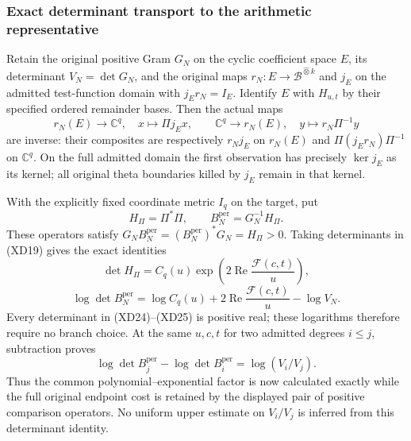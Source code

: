 \subsubsection{Exact determinant transport to the arithmetic representative}

Retain the original positive Gram $G_N$ on the cyclic coefficient
space $E$, its determinant $V_N=\det G_N$, and the original maps
$r_N:E\longrightarrow\mathscr B^{\widehat\otimes k}$ and
$j_E$ on the admitted test-function domain with $j_Er_N=I_E$.
Identify $E$ with $H_{u,t}$ by their specified ordered remainder
bases. Then the actual maps
\[
 r_N(E)\longrightarrow\mathbb C^q,\quad x\longmapsto\Pi j_Ex,
 \qquad
 \mathbb C^q\longrightarrow r_N(E),\quad y\longmapsto r_N\Pi^{-1}y
 \tag{XD22}
\]
are inverse: their composites are respectively $r_Nj_E$ on
$r_N(E)$ and $\Pi(j_Er_N)\Pi^{-1}$ on $\mathbb C^q$.
On the full admitted domain the first observation has precisely
$\ker j_E$ as its kernel; all original theta boundaries killed by
$j_E$ remain in that kernel.

With the explicitly fixed coordinate metric $I_q$ on the target,
put
\[
 H_\Pi=\Pi^*\Pi,\qquad B_N^{\mathrm{per}}=G_N^{-1}H_\Pi.
 \tag{XD23}
\]
These operators satisfy
$G_NB_N^{\mathrm{per}}=(B_N^{\mathrm{per}})^*G_N=H_\Pi>0$.
Taking determinants in (XD19) gives the exact identities
\[
 \det H_\Pi=C_q(u)
       \exp\!\left(2\operatorname{Re}\frac{\mathcal F(c,t)}u\right),
 \tag{XD24}
\]
\[
 \boxed{\log\det B_N^{\mathrm{per}}
 =\log C_q(u)+2\operatorname{Re}\frac{\mathcal F(c,t)}u-\log V_N.}
 \tag{XD25}
\]
Every determinant in (XD24)--(XD25) is positive real; these
logarithms therefore require no branch choice. At the same $u,c,t$
for two admitted degrees $i\leq j$, subtraction proves
\[
 \boxed{\log\det B_j^{\mathrm{per}}-
        \log\det B_i^{\mathrm{per}}=\log(V_i/V_j).}
 \tag{XD26}
\]
Thus the common polynomial--exponential factor is now calculated
exactly while the full original endpoint cost is retained by the
displayed pair of positive comparison operators. No uniform upper
estimate on $V_i/V_j$ is inferred from this determinant identity.


\endgroup
